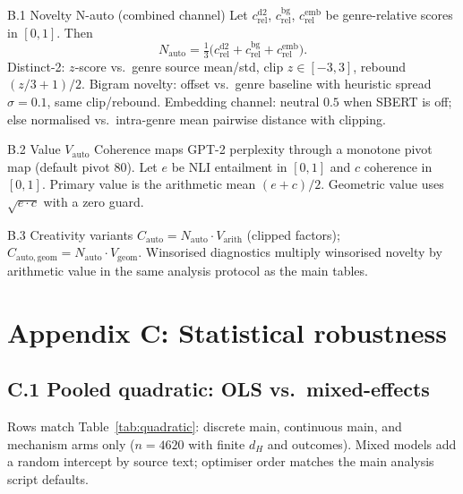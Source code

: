 \begin{DefnBox}{B.1 Novelty N-auto (combined channel)}
Let $c^{\mathrm{d2}}_{\mathrm{rel}}$, $c^{\mathrm{bg}}_{\mathrm{rel}}$, $c^{\mathrm{emb}}_{\mathrm{rel}}$ be genre-relative scores in $[0,1]$. Then
\[
  N_{\mathrm{auto}} = \tfrac{1}{3}\bigl(c^{\mathrm{d2}}_{\mathrm{rel}} + c^{\mathrm{bg}}_{\mathrm{rel}} + c^{\mathrm{emb}}_{\mathrm{rel}}\bigr).
\]
Distinct-2: $z$-score vs.\ genre source mean/std, clip $z\in[-3,3]$, rebound $(z/3+1)/2$. Bigram novelty: offset vs.\ genre baseline with heuristic spread $\sigma{=}0.1$, same clip/rebound. Embedding channel: neutral $0.5$ when SBERT is off; else normalised vs.\ intra-genre mean pairwise distance with clipping.
\end{DefnBox}

\begin{DefnBox}{B.2 Value $V_{\mathrm{auto}}$}
Coherence maps GPT-2 perplexity through a monotone pivot map (default pivot 80). Let $e$ be NLI entailment in $[0,1]$ and $c$ coherence in $[0,1]$. Primary value is the arithmetic mean $(e+c)/2$. Geometric value uses $\sqrt{e\cdot c}$ with a zero guard.
\end{DefnBox}

\begin{DefnBox}{B.3 Creativity variants}
$C_{\mathrm{auto}}=N_{\mathrm{auto}}\cdot V_{\mathrm{arith}}$ (clipped factors); $C_{\mathrm{auto,geom}}=N_{\mathrm{auto}}\cdot V_{\mathrm{geom}}$. Winsorised diagnostics multiply winsorised novelty by arithmetic value in the same analysis protocol as the main tables.
\end{DefnBox}

\section{Appendix C: Statistical robustness}
\label{app:robust}

\subsection{C.1 Pooled quadratic: OLS vs.\ mixed-effects}
Rows match Table~\ref{tab:quadratic}: discrete main, continuous main, and mechanism arms only ($n{=}4620$ with finite $d_H$ and outcomes). Mixed models add a random intercept by source text; optimiser order matches the main analysis script defaults.

